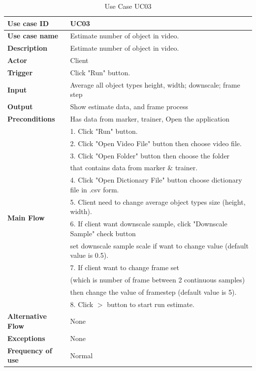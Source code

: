 \begin{table}[H]
  \begin{center}
    \begin{tabular}{ | l | l |} 
    \hline
    \textbf{Use case ID} & UC03 \\
    \hline
    \textbf{Use case name} & Estimate number of object in video. \\
    \hline
    \textbf{Description} & Estimate number of object in video. \\
    \hline
    \textbf{Actor} & Client \\
    \hline
    \textbf{Trigger} & Click "Run" button.\\
    \hline
    \textbf{Input} & Average all object types height, width; downscale; frame step  \\
    \hline
    \textbf{Output} & Show estimate data, and frame process \\
    \hline    
    \textbf{Preconditions} & Has data from marker, trainer, Open the application \\
    \hline
    \multirow{12}{4em}{\textbf{Main Flow}} &   1. Click "Run" button. \\
    & 2. Click "Open Video File" button then choose video file. \\
    & 3. Click "Open Folder" button then choose the folder \\
    & that contains data from marker \& trainer. \\
    & 4. Click "Open Dictionary File" button choose dictionary file in .csv form. \\
    & 5. Client need to change average object types size (height, width). \\
    & 6. If client want downscale sample, click "Downscale Sample" check button \\
    & set downscale sample scale if want to change value (default value is 0.5). \\
    & 7. If client want to change frame set \\
    & (which is number of frame between 2 continuous samples) \\
    & then change the value of framestep (default value is 5). \\
    & 8. Click $>$ button to start run estimate. \\
    \hline
    \textbf{Alternative Flow} & None \\
    \hline
    \textbf{Exceptions} & None \\
    \hline
    \textbf{Frequency of use} & Normal \\
    \hline
    \end{tabular}
  \end{center}
  \caption{Use Case UC03}\label{tab:uc3}
\end{table}
\pagebreak
